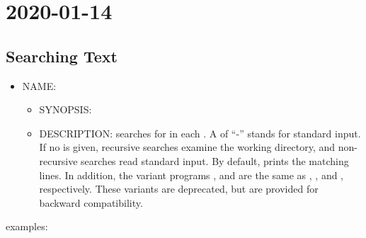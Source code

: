 \section{2020-01-14}
\subsection{Searching Text}
\begin{itemize}
    \item NAME\@: 
          \begin{itemize}
              \item SYNOPSIS\@: 
              \item DESCRIPTION\@:  searches for 
                    in each . A  of ``-'' stands for standard input.
                    If no  is given, recursive searches examine the working directory,
                    and non-recursive searches read standard input.
                    By default,  prints the matching lines.
                    In addition, the variant programs ,  and 
                    are the same as , , and , respectively.
                    These variants are deprecated, but are provided for backward compatibility.
          \end{itemize}
\end{itemize}
 examples:
